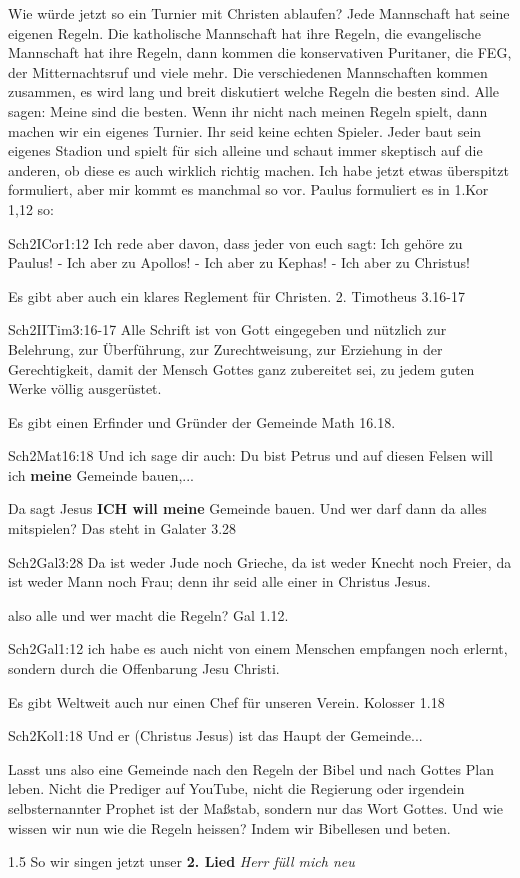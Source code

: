 \documentclass[12pt,a4paper]{scrarticle}
\begin{document}
\begin{spacing}{1.5}
Wie würde jetzt so ein Turnier mit Christen ablaufen? Jede Mannschaft hat seine eigenen Regeln. Die katholische Mannschaft hat ihre Regeln, die evangelische Mannschaft hat ihre Regeln, dann kommen die konservativen Puritaner, die FEG, der Mitternachtsruf und viele mehr. Die verschiedenen Mannschaften kommen zusammen, es wird lang und breit diskutiert welche Regeln die besten sind. Alle sagen: \glqq Meine sind die besten. Wenn ihr nicht nach meinen Regeln spielt, dann machen wir ein eigenes Turnier. Ihr seid keine echten Spieler.\grqq{} Jeder baut sein eigenes Stadion und spielt für sich alleine und schaut immer skeptisch auf die anderen, ob diese es auch wirklich richtig machen.
Ich habe jetzt etwas überspitzt formuliert, aber mir kommt es manchmal so vor.
Paulus formuliert es in 1.Kor 1,12 so: 
\begin{bibeltext}{Sch2}{ICor}{1:12}
Ich rede aber davon, dass jeder von euch sagt: Ich gehöre zu Paulus! - Ich aber zu Apollos! - Ich aber zu Kephas! - Ich aber zu Christus!
\end{bibeltext}
Es gibt aber auch ein klares Reglement für Christen. 2. Timotheus 3.16-17
\begin{bibeltext}{Sch2}{IITim}{3:16-17}
Alle Schrift ist von Gott eingegeben und nützlich zur Belehrung, zur Überführung, zur Zurechtweisung, zur Erziehung in der Gerechtigkeit, damit der Mensch Gottes ganz zubereitet sei, zu jedem guten Werke völlig ausgerüstet.
\end{bibeltext}
Es gibt einen Erfinder und Gründer der Gemeinde Math 16.18. 
\begin{bibeltext}{Sch2}{Mat}{16:18}
Und ich sage dir auch: Du bist Petrus und auf diesen Felsen will ich \textbf{meine} Gemeinde bauen,...
\end{bibeltext}
Da sagt Jesus \textbf{ICH will meine} Gemeinde bauen.
Und wer darf dann da alles mitspielen? Das steht in  Galater 3.28
\begin{bibeltext}{Sch2}{Gal}{3:28}
Da ist weder Jude noch Grieche, da ist weder Knecht noch Freier, da ist weder Mann noch Frau; denn ihr seid alle einer in Christus Jesus.
\end{bibeltext}
also alle und wer macht die Regeln? Gal 1.12.
\begin{bibeltext}{Sch2}{Gal}{1:12}
ich habe es auch nicht von einem Menschen empfangen noch erlernt, sondern durch die Offenbarung Jesu Christi.
\end{bibeltext}
Es gibt Weltweit auch nur einen Chef für unseren Verein. Kolosser 1.18
\begin{bibeltext}{Sch2}{Kol}{1:18}
Und er (Christus Jesus) ist das Haupt der Gemeinde...
\end{bibeltext}
Lasst uns also eine Gemeinde nach den Regeln der Bibel und nach Gottes Plan leben. 
Nicht die Prediger auf YouTube, nicht die Regierung oder irgendein selbsternannter Prophet ist der Maßstab, sondern nur das Wort Gottes. Und wie wissen wir nun wie die Regeln heissen? Indem wir Bibellesen und beten. 
\end{spacing}{1.5}
So wir singen jetzt unser \textbf{2. Lied} \textit{Herr füll mich neu}
\end{document}
